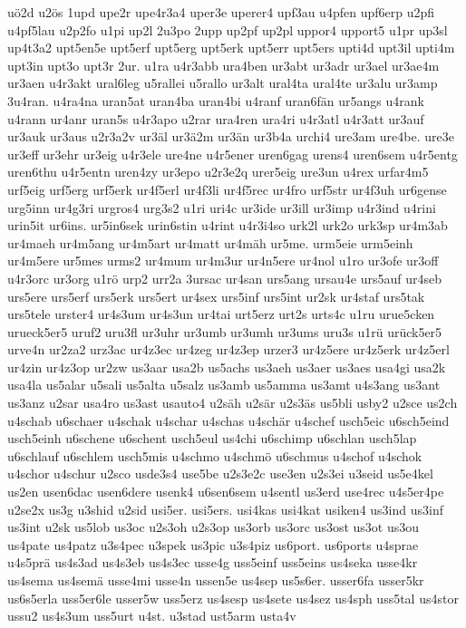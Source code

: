 {uö2d
u2ös
1upd
upe2r
upe4r3a4
uper3e
uperer4
upf3au
u4pfen
upf6erp
u2pfi
u4pf5lau
u2p2fo
u1pi
up2l
2u3po
2upp
up2pf
up2pl
uppor4
upport5
u1pr
up3sl
up4t3a2
upt5en5e
upt5erf
upt5erg
upt5erk
upt5err
upt5ers
upti4d
upt3il
upti4m
upt3in
upt3o
upt3r
2ur.
u1ra
u4r3abb
ura4ben
ur3abt
ur3adr
ur3ael
ur3ae4m
ur3aen
u4r3akt
ural6leg
u5rallei
u5rallo
ur3alt
ural4ta
ural4te
ur3alu
ur3amp
3u4ran.
u4ra4na
uran5at
uran4ba
uran4bi
u4ranf
uran6fän
ur5angs
u4rank
u4rann
ur4anr
uran5s
u4r3apo
u2rar
ura4ren
ura4ri
u4r3atl
u4r3att
ur3auf
ur3auk
ur3aus
u2r3a2v
ur3äl
ur3ä2m
ur3än
ur3b4a
urchi4
ure3am
ure4be.
ure3e
ur3eff
ur3ehr
ur3eig
u4r3ele
ure4ne
u4r5ener
uren6gag
urens4
uren6sem
u4r5entg
uren6thu
u4r5entn
uren4zy
ur3epo
u2r3e2q
urer5eig
ure3un
u4rex
urfar4m5
urf5eig
urf5erg
urf5erk
ur4f5erl
ur4f3li
ur4f5rec
ur4fro
urf5str
ur4f3uh
ur6gense
urg5inn
ur4g3ri
urgros4
urg3s2
u1ri
uri4c
ur3ide
ur3ill
ur3imp
u4r3ind
u4rini
urin5it
ur6ins.
ur5in6sek
urin6stin
u4rint
u4r3i4so
urk2l
urk2o
urk3sp
ur4m3ab
ur4maeh
ur4m5ang
ur4m5art
ur4matt
ur4mäh
ur5me.
urm5eie
urm5einh
ur4m5ere
ur5mes
urms2
ur4mum
ur4m3ur
ur4n5ere
ur4nol
u1ro
ur3ofe
ur3off
u4r3orc
ur3org
u1rö
urp2
urr2a
3ursac
ur4san
urs5ang
ursau4e
urs5auf
ur4seb
urs5ere
urs5erf
urs5erk
urs5ert
ur4sex
urs5inf
urs5int
ur2sk
ur4staf
urs5tak
urs5tele
urster4
ur4s3um
ur4s3un
ur4tai
urt5erz
urt2s
urts4c
u1ru
urue5cken
urueck5er5
uruf2
uru3fl
ur3uhr
ur3umb
ur3umh
ur3ums
uru3s
u1rü
urück5er5
urve4n
ur2za2
urz3ac
ur4z3ec
ur4zeg
ur4z3ep
urzer3
ur4z5ere
ur4z5erk
ur4z5erl
ur4zin
ur4z3op
ur2zw
us3aar
usa2b
us5achs
us3aeh
us3aer
us3aes
usa4gi
usa2k
usa4la
us5alar
u5sali
us5alta
u5salz
us3amb
us5amma
us3amt
u4s3ang
us3ant
us3anz
u2sar
usa4ro
us3ast
usauto4
u2säh
u2sär
u2s3äs
us5bli
usby2
u2sce
us2ch
u4schab
u6schaer
u4schak
u4schar
u4schas
u4schär
u4schef
usch5eic
u6sch5eind
usch5einh
u6schene
u6schent
usch5eul
us4chi
u6schimp
u6schlan
usch5lap
u6schlauf
u6schlem
usch5mis
u4schmo
u4schmö
u6schmus
u4schof
u4schok
u4schor
u4schur
u2sco
usde3s4
use5be
u2s3e2c
use3en
u2s3ei
u3seid
us5e4kel
us2en
usen6dac
usen6dere
usenk4
u6sen6sem
u4sentl
us3erd
use4rec
u4s5er4pe
u2se2x
us3g
u3shid
u2sid
usi5er.
usi5ers.
usi4kas
usi4kat
usiken4
us3ind
us3inf
us3int
u2sk
us5lob
us3oc
u2s3oh
u2s3op
us3orb
us3orc
us3ost
us3ot
us3ou
us4pate
us4patz
u3s4pec
u3spek
us3pic
u3s4piz
us6port.
us6ports
u4sprae
u4s5prä
us4s3ad
us4s3eb
us4s3ec
usse4g
uss5einf
uss5eins
us4seka
usse4kr
us4sema
us4semä
usse4mi
usse4n
ussen5e
us4sep
us5s6er.
usser6fa
usser5kr
us6s5erla
uss5er6le
usser5w
uss5erz
us4sesp
us4sete
us4sez
us4sph
uss5tal
us4stor
ussu2
us4s3um
uss5urt
u4st.
u3stad
ust5arm
usta4v
}
